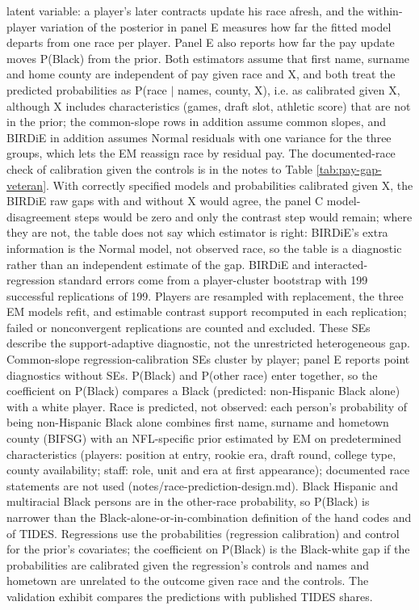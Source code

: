 {latent variable: a player's later contracts update his race afresh, and the within-player variation of the posterior in panel E measures how far the fitted model departs from one race per player. Panel E also reports how far the pay update moves P(Black) from the prior. Both estimators assume that first name, surname and home county are independent of pay given race and X, and both treat the predicted probabilities as P(race $|$ names, county, X), i.e. as calibrated given X, although X includes characteristics (games, draft slot, athletic score) that are not in the prior; the common-slope rows in addition assume common slopes, and BIRDiE in addition assumes Normal residuals with one variance for the three groups, which lets the EM reassign race by residual pay. The documented-race check of calibration given the controls is in the notes to Table \ref{tab:pay-gap-veteran}. With correctly specified models and probabilities calibrated given X, the BIRDiE raw gaps with and without X would agree, the panel C model-disagreement steps would be zero and only the contrast step would remain; where they are not, the table does not say which estimator is right: BIRDiE's extra information is the Normal model, not observed race, so the table is a diagnostic rather than an independent estimate of the gap. BIRDiE and interacted-regression standard errors come from a player-cluster bootstrap with 199 successful replications of 199. Players are resampled with replacement, the three EM models refit, and estimable contrast support recomputed in each replication; failed or nonconvergent replications are counted and excluded. These SEs describe the support-adaptive diagnostic, not the unrestricted heterogeneous gap. Common-slope regression-calibration SEs cluster by player; panel E reports point diagnostics without SEs. P(Black) and P(other race) enter together, so the coefficient on P(Black) compares a Black (predicted: non-Hispanic Black alone) with a white player. Race is predicted, not observed: each person's probability of being non-Hispanic Black alone combines first name, surname and hometown county (BIFSG) with an NFL-specific prior estimated by EM on predetermined characteristics (players: position at entry, rookie era, draft round, college type, county availability; staff: role, unit and era at first appearance); documented race statements are not used (notes/race-prediction-design.md). Black Hispanic and multiracial Black persons are in the other-race probability, so P(Black) is narrower than the Black-alone-or-in-combination definition of the hand codes and of TIDES. Regressions use the probabilities (regression calibration) and control for the prior's covariates; the coefficient on P(Black) is the Black-white gap if the probabilities are calibrated given the regression's controls and names and hometown are unrelated to the outcome given race and the controls. The validation exhibit compares the predictions with published TIDES shares.
\par}

